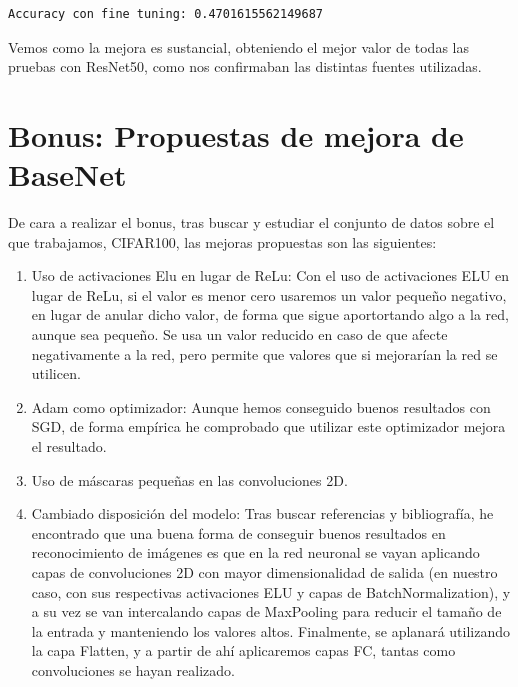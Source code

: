 \documentclass[12pt, spanish]{article}
\begin{document}
\begin{lstlisting}
Accuracy con fine tuning: 0.4701615562149687
\end{lstlisting}

Vemos como la mejora es sustancial, obteniendo el mejor valor de todas las pruebas con ResNet50, como nos confirmaban las distintas fuentes utilizadas.







\newpage

\section{Bonus: Propuestas de mejora de BaseNet}

De cara a realizar el bonus, tras buscar y estudiar el conjunto de datos sobre el que trabajamos\cite{cifar100bonus}, CIFAR100, las mejoras propuestas son las siguientes:

\begin{enumerate}
	\item Uso de activaciones Elu en lugar de ReLu: Con el uso de activaciones ELU en lugar de ReLu, si el valor es menor cero usaremos un valor pequeño negativo, en lugar de anular dicho valor, de forma que sigue aportortando algo a la red, aunque sea pequeño. Se usa un valor reducido en caso de que afecte negativamente a la red, pero permite que valores que si mejorarían la red se utilicen.
	\item Adam\cite{adam} como optimizador: Aunque hemos conseguido buenos resultados con SGD, de forma empírica he comprobado que utilizar este optimizador mejora el resultado.
	\item Uso de máscaras pequeñas en las convoluciones 2D\cite{convksize}.
	\item Cambiado disposición del modelo: Tras buscar referencias y bibliografía\cite{cifar100bonus}, he encontrado que una buena forma de conseguir buenos resultados en reconocimiento de imágenes es que en la red neuronal se vayan aplicando capas de convoluciones 2D con mayor dimensionalidad de salida (en nuestro caso, con sus respectivas activaciones ELU y capas de BatchNormalization), y a su vez se van intercalando capas de MaxPooling para reducir el tamaño de la entrada y manteniendo los valores altos. Finalmente, se aplanará utilizando la capa Flatten, y a partir de ahí aplicaremos capas FC, tantas como convoluciones se hayan realizado.
\end{enumerate}
\end{document}
